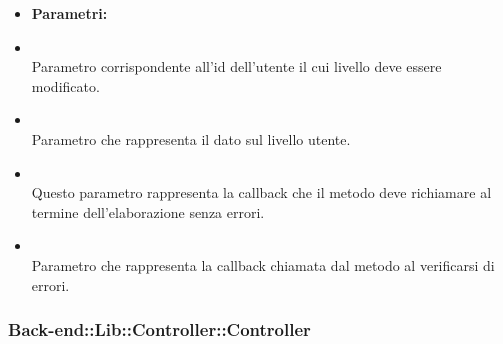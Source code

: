 \begin{itemize}
\begin{itemize}
\item[] \textbf{Parametri:}
\item[]  \\ Parametro corrispondente all'id dell'utente il cui livello deve essere modificato.
\item[]  \\ Parametro che rappresenta il dato sul livello utente.
\item[]  \\ Questo parametro rappresenta la callback che il metodo deve richiamare al termine dell'elaborazione senza errori.
\item[]  \\ Parametro che rappresenta la callback chiamata dal metodo al verificarsi di errori.
\end{itemize}
\end{itemize}

	\subsubsection{Back-end::Lib::Controller::Controller} 
